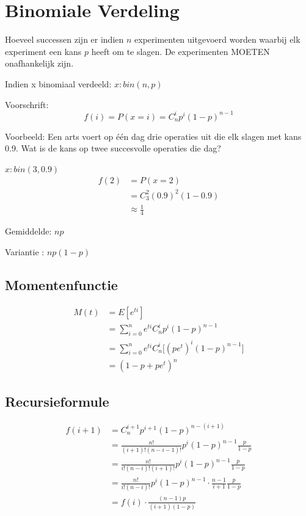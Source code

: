 \documentclass[12pt]{report}
\newcommand{\example}[2]{
      \hrulefill
      
      Voorbeeld: #1
      
      #2
      
      \hrulefill
  }
\begin{document}
\section{Binomiale Verdeling}
Hoeveel successen zijn er indien $n$ experimenten uitgevoerd worden waarbij elk experiment een kans $p$ heeft om te slagen. De experimenten MOETEN onafhankelijk zijn.

Indien x binomiaal verdeeld: $x : bin(n, p)$

Voorschrift:
$$f(i) = P(x = i) = C_n^ip^i(1 - p)^{n - 1}$$

\example{
    Een arts voert op één dag drie operaties uit die elk slagen met kans 0.9. Wat is de kans op twee succesvolle operaties die dag?
}{
    $x : bin(3, 0.9)$
    \begin{equation*}
     \begin{split}
        f(2) & = P(x = 2) \\
             & = C_3^2(0.9)^2(1 - 0.9) \\
             & \approx \frac{1}{4}
     \end{split}
    \end{equation*}

}

Gemiddelde: $np$

Variantie : $np(1 - p)$
\subsection{Momentenfunctie}
\begin{equation*}
 \begin{split}
  M(t) & = E[e^{ti}] \\
       & = \sum_{i=0}^n e^{ti}C_n^ip^i(1 -p)^{n - 1} \\
       & = \sum_{i=0}^n e^{ti}C_n^i\bigg[(pe^t)^i(1 -p)^{n - 1}\bigg] \\ 
       & = ( 1 - p + pe^t)^n
 \end{split}
\end{equation*}

\subsection{Recursieformule}
\begin{equation*}
 \begin{split}
  f(i + 1) & = C_n^{i + 1}p^{i + 1}(1 - p)^{n- (i + 1)} \\
           & = \frac{n!}{(i + 1)!(n - i - 1)!}p^i(1 -p)^{n - 1} \frac{p}{1 - p} \\
           & = \frac{n!}{i!(n - i)!(i + 1)!}p^i(1 -p)^{n - 1} \frac{p}{1 - p} \\
           & = \frac{n!}{i!(n - i)!}p^i(1 -p)^{n - 1} \cdot \frac{n - 1}{i + 1}\frac{p}{1 - p} \\
           & = f(i) \cdot \frac{(n - 1)p}{(i + 1)(1 - p)}
 \end{split}
\end{equation*}
\end{document}
